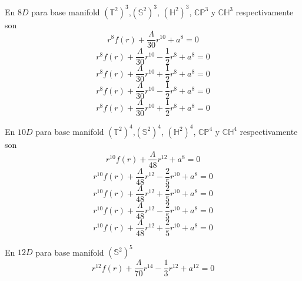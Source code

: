 En $8 D$ para base manifold $(\mathbb{T}^2)^3$,$(\mathbb{S}^2)^3$, $(\mathbb{H}^2)^3$, $\mathbb{CP}^3$ y $\mathbb{CH}^3$ respectivamente son
\begin{equation*}
    r^8f(r)+\frac{\Lambda}{30}r^{10}+a^8=0
\end{equation*}
\begin{equation*}
    r^8f(r)+\frac{\Lambda}{30}r^{10}-\frac{1}{2}r^8+a^8=0
\end{equation*}
\begin{equation*}
    r^8f(r)+\frac{\Lambda}{30}r^{10}+\frac{1}{2}r^8+a^8=0
\end{equation*}
\begin{equation*}
    r^8f(r)+\frac{\Lambda}{30}r^{10}-\frac{1}{2}r^8+a^8=0
\end{equation*}
\begin{equation*}
    r^8f(r)+\frac{\Lambda}{30}r^{10}+\frac{1}{2}r^8+a^8=0
\end{equation*}

En $10 D$ para base manifold $(\mathbb{T}^2)^4$,$(\mathbb{S}^2)^4$, $(\mathbb{H}^2)^4$, $\mathbb{CP}^4$ y $\mathbb{CH}^4$ respectivamente son
\begin{equation*}
    r^{10}f(r)+\frac{\Lambda}{48}r^{12}+a^8=0
\end{equation*}
\begin{equation*}
    r^{10}f(r)+\frac{\Lambda}{48}r^{12}-\frac{2}{5}r^{10}+a^8=0
\end{equation*}
\begin{equation*}
    r^{10}f(r)+\frac{\Lambda}{48}r^{12}+\frac{2}{5}r^{10}+a^8=0
\end{equation*}
\begin{equation*}
    r^{10}f(r)+\frac{\Lambda}{48}r^{12}-\frac{2}{5}r^{10}+a^8=0
\end{equation*}
\begin{equation*}
    r^{10}f(r)+\frac{\Lambda}{48}r^{12}+\frac{2}{5}r^{10}+a^8=0
\end{equation*}

En $12 D$ para base manifold $(\mathbb{S}^2)^5$
\begin{equation*}
    r^{12}f(r)+\frac{\Lambda}{70}r^{14}-\frac{1}{3}r^{12}+a^{12}=0
\end{equation*}

